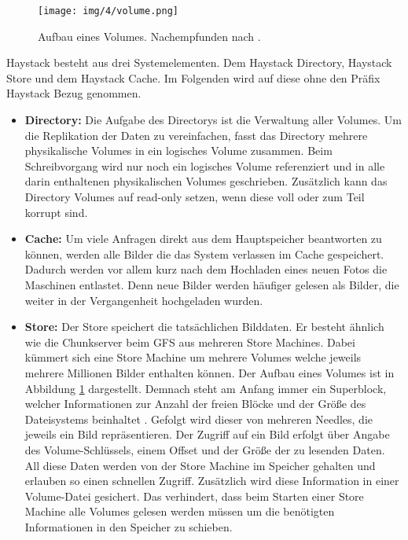 \documentclass[12pt,oneside,a4paper,parskip]{scrbook}
\begin{document}
\begin{figure}
  \centering
  \texttt{[image: img/4/volume.png]}
  \caption[Aufbau eines Volumes]{ Aufbau eines Volumes. Nachempfunden nach \cite{haystack}.}
  \label{volume}
\end{figure}
Haystack besteht aus drei Systemelementen. Dem Haystack Directory, Haystack Store und dem Haystack Cache. Im Folgenden wird auf diese ohne den Präfix Haystack Bezug genommen.
\begin{itemize}
  \item \textbf{Directory:} Die Aufgabe des Directorys ist die Verwaltung aller Volumes. Um die Replikation der Daten zu vereinfachen, fasst das Directory mehrere physikalische Volumes in ein logisches Volume zusammen. Beim Schreibvorgang wird nur noch ein logisches Volume referenziert und in alle darin enthaltenen physikalischen Volumes geschrieben. Zusätzlich kann das Directory Volumes auf read-only setzen, wenn diese voll oder zum Teil korrupt sind.
  \item \textbf{Cache:} Um viele Anfragen direkt aus dem Hauptspeicher beantworten zu können, werden alle Bilder die das System verlassen im Cache gespeichert. Dadurch werden vor allem kurz nach dem Hochladen eines neuen Fotos die Maschinen entlastet. Denn neue Bilder werden häufiger gelesen als Bilder, die weiter in der Vergangenheit hochgeladen wurden. 
  \item \textbf{Store:} Der Store speichert die tatsächlichen Bilddaten. Er besteht ähnlich wie die Chunkserver beim GFS aus mehreren Store Machines. Dabei kümmert sich eine Store Machine um mehrere Volumes welche jeweils mehrere Millionen Bilder enthalten können. Der Aufbau eines Volumes ist in Abbildung \ref{volume} dargestellt. Demnach steht am Anfang immer ein Superblock, welcher Informationen zur Anzahl der freien Blöcke und der Größe des Dateisystems beinhaltet \cite{wiki:superblock}. Gefolgt wird dieser von mehreren Needles, die jeweils ein Bild repräsentieren. Der Zugriff auf ein Bild erfolgt über Angabe des Volume-Schlüssels, einem Offset und der Größe der zu lesenden Daten. All diese Daten werden von der Store Machine im Speicher gehalten und erlauben so einen schnellen Zugriff. Zusätzlich wird diese Information in einer Volume-Datei gesichert. Das verhindert, dass beim Starten einer Store Machine alle Volumes gelesen werden müssen um die benötigten Informationen in den Speicher zu schieben. 
\end{itemize}
\end{document}
